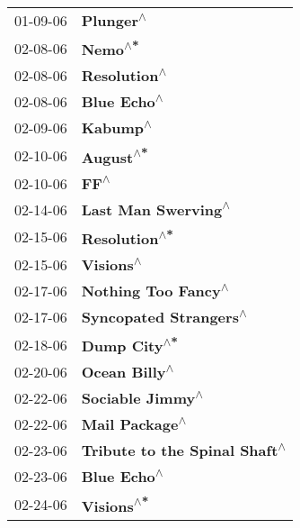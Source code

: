 \begin{supertabular}{p{0.25\columnwidth}p{0.75\columnwidth}}
 01-09-06 &                                         \textbf{Plunger\textsuperscript{$\wedge$}} \\
 02-08-06 &                                           \textbf{Nemo\textsuperscript{$\wedge$*}} \\
 02-08-06 &                                      \textbf{Resolution\textsuperscript{$\wedge$}} \\
 02-08-06 &                                       \textbf{Blue Echo\textsuperscript{$\wedge$}} \\
 02-09-06 &                                          \textbf{Kabump\textsuperscript{$\wedge$}} \\
 02-10-06 &                                         \textbf{August\textsuperscript{$\wedge$*}} \\
 02-10-06 &                                              \textbf{FF\textsuperscript{$\wedge$}} \\
 02-14-06 &                               \textbf{Last Man Swerving\textsuperscript{$\wedge$}} \\
 02-15-06 &                                     \textbf{Resolution\textsuperscript{$\wedge$*}} \\
 02-15-06 &                                         \textbf{Visions\textsuperscript{$\wedge$}} \\
 02-17-06 &                               \textbf{Nothing Too Fancy\textsuperscript{$\wedge$}} \\
 02-17-06 &                            \textbf{Syncopated Strangers\textsuperscript{$\wedge$}} \\
 02-18-06 &                                      \textbf{Dump City\textsuperscript{$\wedge$*}} \\
 02-20-06 &                                     \textbf{Ocean Billy\textsuperscript{$\wedge$}} \\
 02-22-06 &                                  \textbf{Sociable Jimmy\textsuperscript{$\wedge$}} \\
 02-22-06 &                                    \textbf{Mail Package\textsuperscript{$\wedge$}} \\
 02-23-06 &                     \textbf{Tribute to the Spinal Shaft\textsuperscript{$\wedge$}} \\
 02-23-06 &                                       \textbf{Blue Echo\textsuperscript{$\wedge$}} \\
 02-24-06 &                                        \textbf{Visions\textsuperscript{$\wedge$*}} \\

\end{supertabular}
